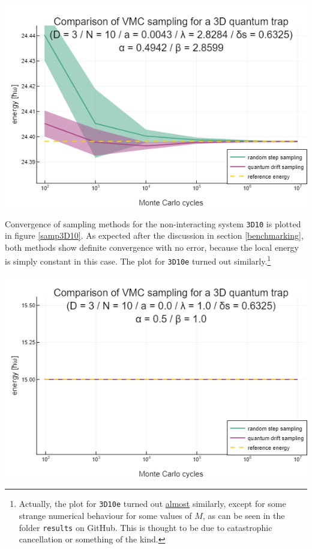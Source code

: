 \documentclass[a4paper,8pt]{article}
\begin{document}
\begin{multicols}{2}
\begin{center}
\includegraphics[width=0.9\columnwidth]{fig3D10ie_sampling}
\label{samp3D10ie}
\end{center}

Convergence of sampling methods for the non-interacting system \texttt{3D10} is plotted in figure \ref{samp3D10}. As expected after the discussion in section \ref{benchmarking}, both methods show definite convergence with no error, because the local energy is simply constant in this case. The plot for \texttt{3D10e} turned out similarly.\footnote{Actually, the plot for \texttt{3D10e} turned out \underline{almost} similarly, except for some strange numerical behaviour for some values of $M$, as can be seen in the folder \texttt{results} on GitHub. This is thought to be due to catastrophic cancellation or something of the kind.} 

\begin{center}
\includegraphics[width=0.9\columnwidth]{fig3D10_sampling}
\label{samp3D10}
\end{center}


\end{multicols}
\end{document}
